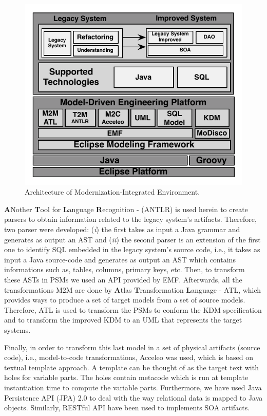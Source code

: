 \documentclass[a4paper,twoside]{article}
\begin{document}
\begin{figure}[!h]
\centering
 \includegraphics[scale=0.6]{Figuras/Arquitetura_da_Ferramenta}
\caption{Architecture of Modernization-Integrated Environment.}
\label{fig:architecture}
\end{figure}


\textbf{A}Nother \textbf{T}ool for \textbf{L}anguage \textbf{R}ecognition -  (ANTLR) is used herein to create parsers to obtain information related to the legacy system's artifacts. Therefore, two parser were developed: (\textit{i}) the first takes as input a Java grammar and generates as output an AST and (\textit{ii}) the second parser is an extension of the first one to identify SQL embedded in the legacy system's source code, i.e., it takes as input a Java source-code and generates as output an AST which contains informations such as, tables, columns, primary keys, etc. Then, to transform these ASTs in PSMs we used an API provided by EMF. Afterwards, all the transformations M2M are done by \textbf{A}tlas \textbf{T}ransformation \textbf{L}anguage - ATL, which provides ways to produce a set of target models from a set of source models. Therefore, ATL is used to transform the PSMs to conform the KDM specification and to transform the improved KDM to an UML that represents the target systems. 

Finally, in order to transform this last model in a set of physical artifacts (source code), i.e., model-to-code transformations, Acceleo was used, which is based on textual template approach. A template can be thought of as the target text with holes for variable parts. The holes contain metacode which is run at template instantiation time to compute the variable parts. Furthermore, we have used Java Persistence API (JPA) 2.0 to deal with the way relational data is mapped to Java objects. Similarly, RESTful API have been used to implements SOA artifacts. 
\end{document}
